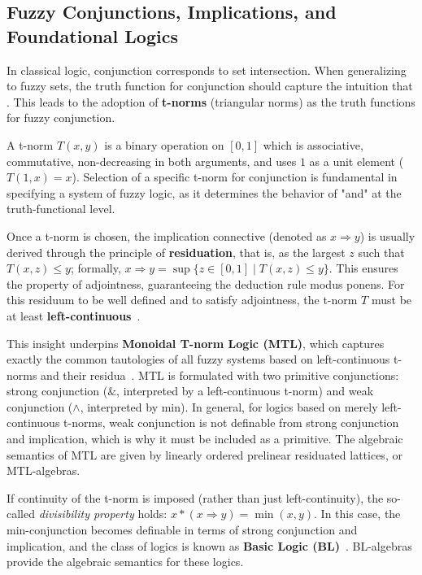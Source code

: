 
\subsection{Fuzzy Conjunctions, Implications, and Foundational Logics}

In classical logic, conjunction corresponds to set intersection. When generalizing to fuzzy sets, the truth function for conjunction should capture the intuition that \cite[p.27]{Hajek1998}. This leads to the adoption of \textbf{t-norms} (triangular norms) as the truth functions for fuzzy conjunction.

A t-norm $T(x, y)$ is a binary operation on $[0,1]$ which is associative, commutative, non-decreasing in both arguments, and uses $1$ as a unit element ($T(1, x) = x$). Selection of a specific t-norm for conjunction is fundamental in specifying a system of fuzzy logic, as it determines the behavior of "and" at the truth-functional level.

Once a t-norm is chosen, the implication connective (denoted as $x \Rightarrow y$) is usually derived through the principle of \textbf{residuation}, that is, as the largest $z$ such that $T(x, z) \le y$; formally, $x \Rightarrow y = \sup\{z \in [0,1] \mid T(x, z) \le y\}$. This ensures the property of adjointness, guaranteeing the deduction rule modus ponens. For this residuum to be well defined and to satisfy adjointness, the t-norm $T$ must be at least \textbf{left-continuous}~\cite[p.272]{GodoMonoidal}.

This insight underpins \textbf{Monoidal T-norm Logic (MTL)}, which captures exactly the common tautologies of all fuzzy systems based on left-continuous t-norms and their residua~\cite{GodoMonoidal}. MTL is formulated with two primitive conjunctions: strong conjunction ($\&$, interpreted by a left-continuous t-norm) and weak conjunction ($\wedge$, interpreted by min). In general, for logics based on merely left-continuous t-norms, weak conjunction is not definable from strong conjunction and implication, which is why it must be included as a primitive. The algebraic semantics of MTL are given by linearly ordered prelinear residuated lattices, or MTL-algebras.

If continuity of the t-norm is imposed (rather than just left-continuity), the so-called \emph{divisibility property} holds: $x * (x \Rightarrow y) = \min(x, y)$. In this case, the min-conjunction becomes definable in terms of strong conjunction and implication, and the class of logics is known as \textbf{Basic Logic (BL)}~\cite[Sec. 2.2]{Hajek1998}. BL-algebras provide the algebraic semantics for these logics.

